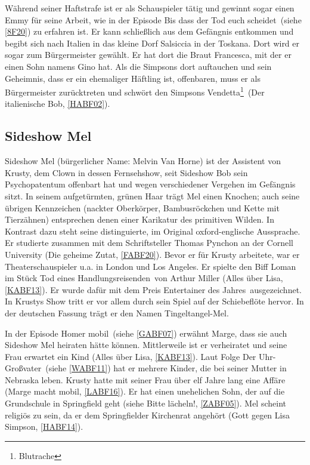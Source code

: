 Während seiner Haftstrafe ist er als Schauspieler tätig und gewinnt sogar einen Emmy für seine Arbeit, wie in der Episode \glqq Bis dass der Tod euch scheidet\grqq\ (siehe \ref{8F20}) zu erfahren ist. Er kann schließlich aus dem Gefängnis entkommen und begibt sich nach Italien in das kleine Dorf Salsiccia in der Toskana. Dort wird er sogar zum Bürgermeister gewählt. Er hat dort die Braut Francesca, mit der er einen Sohn namens Gino hat. Als die Simpsons dort auftauchen und sein Geheimnis, dass er ein ehemaliger Häftling ist, offenbaren, muss er als Bürgermeister zurücktreten und schwört den Simpsons \glqq Vendetta\footnote{Blutrache}\grqq\ (\glqq Der italienische Bob\grqq , \ref{HABF02}).

\subsection{Sideshow Mel}\label{MelvinVanHorne}
Sideshow Mel (bürgerlicher Name: Melvin Van Horne) ist der Assistent von Krusty, dem Clown in dessen Fernsehshow, seit Sideshow Bob sein Psychopatentum offenbart hat und wegen verschiedener Vergehen im Gefängnis sitzt. In seinem aufgetürmten, grünen Haar trägt Mel einen Knochen; auch seine übrigen Kennzeichen (nackter Oberkörper, Bambusröckchen und Kette mit Tierzähnen) entsprechen denen einer Karikatur des \glqq primitiven Wilden\grqq . In Kontrast dazu steht seine distinguierte, im Original oxford-englische Aussprache. Er studierte zusammen mit dem Schriftsteller Thomas Pynchon an der Cornell University (\glqq Die geheime Zutat\grqq , \ref{FABF20}). Bevor er für Krusty arbeitete, war er Theaterschauspieler u.a. in London und Los Angeles. Er spielte den Biff Loman im Stück \glqq Tod eines Handlungsreisenden\grqq\ von Arthur Miller (\glqq Alles über Lisa\grqq , \ref{KABF13}). Er wurde dafür mit dem Preis \glqq Entertainer des Jahres\grqq\ ausgezeichnet. In Krustys Show tritt er vor allem durch sein Spiel auf der Schiebeflöte hervor. In der deutschen Fassung trägt er den Namen Tingeltangel-Mel.

In der Episode \glqq Homer mobil\grqq\ (siehe \ref{GABF07}) erwähnt Marge, dass sie auch Sideshow Mel heiraten hätte können. Mittlerweile ist er verheiratet und seine Frau erwartet ein Kind (\glqq Alles über Lisa\grqq , \ref{KABF13}). Laut Folge \glqq Der Uhr-Großvater\grqq\ (siehe \ref{WABF11}) hat er mehrere Kinder, die bei seiner Mutter in Nebraska leben. Krusty hatte mit seiner Frau über elf Jahre lang eine Affäre (\glqq Marge macht mobil\grqq , \ref{LABF16}). Er hat einen unehelichen Sohn, der auf die Grundschule in Springfield geht (siehe \glqq Bitte lächeln!\grqq, \ref{ZABF05}). Mel scheint religiös zu sein, da er dem Springfielder Kirchenrat angehört (\glqq Gott gegen Lisa Simpson\grqq, \ref{HABF14}).

